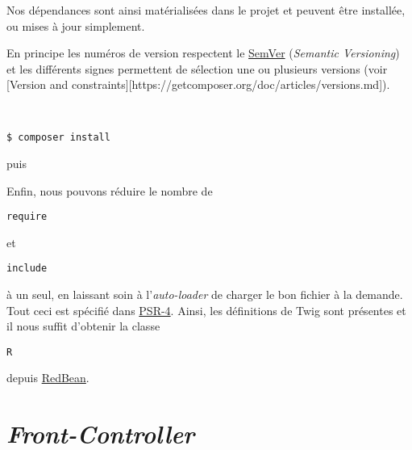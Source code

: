Nos dépendances sont ainsi matérialisées dans le projet et peuvent être
installée, ou mises à jour simplement.

En principe les numéros de version respectent le
\href{http://semver.org/lang/fr/}{SemVer} (\emph{Semantic Versioning})
et les différents signes permettent de sélection une ou plusieurs
versions (voir {[}Version and
constraints{]}{[}https://getcomposer.org/doc/articles/versions.md{]}).

\begin{otherlanguage}{english}

\begin{verbatim}


$ composer install
\end{verbatim}

\end{otherlanguage}

puis

\begin{otherlanguage}{english}

\begin{Shaded}
\begin{Highlighting}[]
 

 \OtherTok{;}

 \OtherTok{;}
\end{Highlighting}
\end{Shaded}

\end{otherlanguage}

Enfin, nous pouvons réduire le nombre de
\begin{otherlanguage}{english}\texttt{require}\end{otherlanguage} et
\begin{otherlanguage}{english}\texttt{include}\end{otherlanguage} à un
seul, en laissant soin à l'\emph{auto-loader} de charger le bon fichier
à la demande. Tout ceci est spécifié dans
\href{http://www.php-fig.org/psr/psr-4/}{PSR-4}. Ainsi, les définitions
de Twig sont présentes et il nous suffit d'obtenir la classe
\begin{otherlanguage}{english}\texttt{R}\end{otherlanguage} depuis
\href{http://www.redbeanphp.com/}{RedBean}.

\hypertarget{front-controller}{%
\section{\texorpdfstring{\emph{Front-Controller}}{Front-Controller}}\label{front-controller}}

